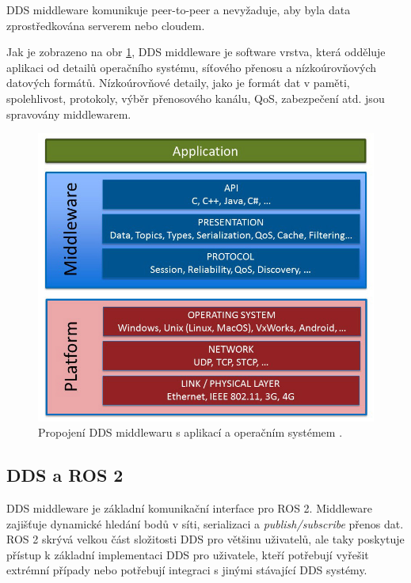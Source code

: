 \acs{DDS} middleware komunikuje peer-to-peer a nevyžaduje, aby byla data zprostředkována serverem nebo cloudem. 

Jak je zobrazeno na obr \ref{fig:DDSmiddleware}, \acs{DDS} middleware je software vrstva, která odděluje aplikaci od detailů operačního systému, síťového přenosu a nízkoúrovňových datových formátů. Nízkoúrovňové detaily, jako je formát dat v paměti, spolehlivost, protokoly, výběr přenosového kanálu, \acs{QoS}, zabezpečení atd. jsou spravovány middlewarem. 

\begin{figure}[!ht]
  \begin{center}
    \includegraphics[scale=0.4]{obrazky/DDS1}
  \end{center}
  \caption[Propojení \acs{DDS} middlewaru s aplikací a operačním systémem]{Propojení \acs{DDS} middlewaru s aplikací a operačním systémem \cite{DDS_Main}.}
  \label{fig:DDSmiddleware}
\end{figure}

\subsection{\acs{DDS} a ROS 2}

\acs{DDS} middleware je základní komunikační interface pro ROS 2. Middleware zajišťuje dynamické hledání bodů v síti, serializaci a \textit{publish/subscribe} přenos dat. ROS 2 skrývá velkou část složitosti \acs{DDS} pro většinu uživatelů, ale taky poskytuje přístup k základní implementaci \acs{DDS} pro uživatele, kteří potřebují vyřešit extrémní případy nebo potřebují integraci s jinými stávající \acs{DDS} systémy. \cite{ROS2DDS}

